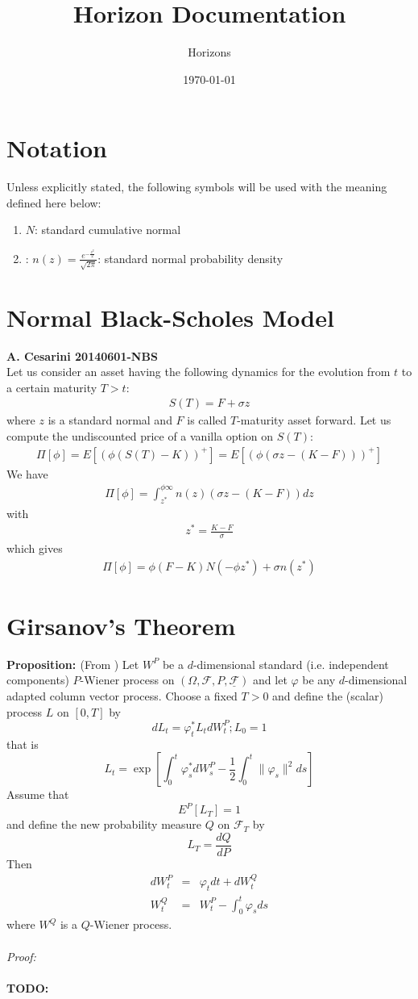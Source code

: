 \documentclass[12pt, a4paper]{article}
\title{\textbf{Horizon Documentation}}
\author{Horizons}
\affil{Horizon}
\date{\today}
\newcommand{\todo}{{\bf TODO:}}
\newcommand\be{\begin{eqnarray}}
\newcommand\ee{\end{eqnarray}}
\newcommand{\PROP} {{\bf{Proposition: }}}
\newcommand{\PROOF} {{\emph{Proof: \\ \\}}}
\newcommand{\FF} {\mathcal{F} }
\newcommand{\FLT} {\underline{\mathcal{F}}}
\begin{document}
\maketitle

\section{Notation}
Unless explicitly stated, the following symbols will be used with the meaning defined here below:
\begin{enumerate}
\item $N$: standard cumulative normal
\item: $n(z)=\frac{e^{-\frac{z^2}{2}}}{\sqrt{2\pi}}$: standard normal probability density
\end{enumerate}

\section{Normal Black-Scholes Model}

{\bf{A. Cesarini 20140601-NBS}} \\
Let us consider an asset having the following dynamics for the evolution from $t$ to a certain maturity $T>t$:
\be
S(T) = F+\sigma z
\ee
where $z$ is a standard normal and $F$ is called $T$-maturity asset forward.
Let us compute the undiscounted price of a vanilla option on $S(T)$:
\be
\Pi[\phi] = E\left[ \left( \phi (S(T)-K) \right)^+\right]= E\left[ \left( \phi (\sigma z - (K-F)) \right)^+\right]
\ee
We have
\be
\Pi[\phi] = \int_{z^*}^{\phi \infty} n(z)  (\sigma z - (K-F)) dz 
\ee  
with 
\be
z^* = \frac{K-F}{\sigma}
\ee
which gives
\be
\Pi[\phi] = \phi (F-K) N(-\phi z^*) + \sigma n(z^*)
\ee


\section{Girsanov's Theorem}

\PROP (From \cite{Bjork}) Let $W^P$ be a $d$-dimensional standard (i.e. independent components) $P$-Wiener process on $(\Omega, \FF, P, \FLT)$ and let $\varphi$ be any $d$-dimensional adapted column vector process. Choose a fixed $T>0$ and define the (scalar) process $L$ on $[0,T]$ by
\[
dL_t=\varphi_t^* L_t dW_t^P; L_0=1
\]
that is
\[
L_t=\exp\left[\int_0^t \varphi_s^* dW_s^P -\frac{1}{2}\int_0^t \| \varphi_s\|^2 ds\right]
\]
Assume that 
\[
E^P[L_T]=1
\]
and define the new probability measure $Q$ on $\FF_T$ by
\[
L_T=\frac{dQ}{dP} 
\]
Then 
\be
dW_t^P&=&\varphi_t dt + dW_t^Q \label{girseq1}\\
W_t^Q&=&W_t^P -\int_0^t \varphi_s ds\label{girseq2}
\ee
where $W^Q$ is a $Q$-Wiener process. \\ \\
\PROOF
\todo
\end{document}
